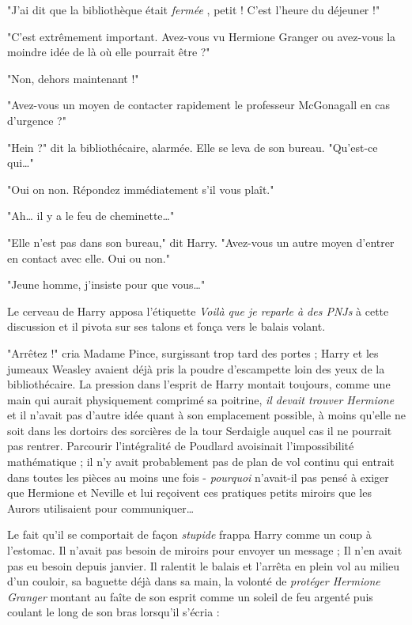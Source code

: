 "J'ai dit que la bibliothèque était \emph{fermée} , petit ! C'est l'heure du déjeuner !"

"C'est extrêmement important. Avez-vous vu Hermione Granger ou avez-vous la moindre idée de là où elle pourrait être ?"

"Non, dehors maintenant !"

"Avez-vous un moyen de contacter rapidement le professeur McGonagall en cas d'urgence ?"

"Hein ?" dit la bibliothécaire, alarmée. Elle se leva de son bureau. "Qu'est-ce qui…"

"Oui on non. Répondez immédiatement s'il vous plaît."

"Ah… il y a le feu de cheminette…"

"Elle n'est pas dans son bureau," dit Harry. "Avez-vous un autre moyen d'entrer en contact avec elle. Oui ou non."

"Jeune homme, j'insiste pour que vous…"

Le cerveau de Harry apposa l'étiquette \emph{Voilà que je reparle à des PNJs}  à cette discussion et il pivota sur ses talons et fonça vers le balais volant.

"Arrêtez !" cria Madame Pince, surgissant trop tard des portes ; Harry et les jumeaux Weasley avaient déjà pris la poudre d'escampette loin des yeux de la bibliothécaire. La pression dans l'esprit de Harry montait toujours, comme une main qui aurait physiquement comprimé sa poitrine, \emph{il devait trouver Hermione}  et il n'avait pas d'autre idée quant à son emplacement possible, à moins qu'elle ne soit dans les dortoirs des sorcières de la tour Serdaigle auquel cas il ne pourrait pas rentrer. Parcourir l'intégralité de Poudlard avoisinait l'impossibilité mathématique ; il n'y avait probablement pas de plan de vol continu qui entrait dans toutes les pièces au moins une fois - \emph{pourquoi}  n'avait-il pas pensé à exiger que Hermione et Neville et lui reçoivent ces pratiques petits miroirs que les Aurors utilisaient pour communiquer…

Le fait qu'il se comportait de façon \emph{stupide}  frappa Harry comme un coup à l'estomac. Il n'avait pas besoin de miroirs pour envoyer un message ; Il n'en avait pas eu besoin depuis janvier. Il ralentit le balais et l'arrêta en plein vol au milieu d'un couloir, sa baguette déjà dans sa main, la volonté de \emph{protéger Hermione Granger}  montant au faîte de son esprit comme un soleil de feu argenté puis coulant le long de son bras lorsqu'il s'écria :

